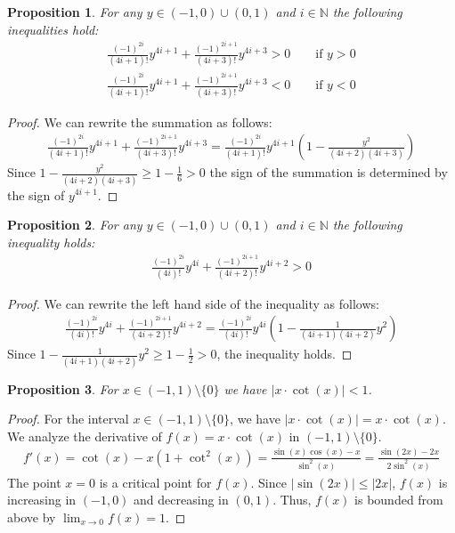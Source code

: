 \documentclass{article}
\newcommand{\nat}{\mathbb{N}}
\numberwithin{mytheorem}{section}
\newtheorem{proposition}{Proposition}
\begin{document}
\begin{proposition}\label{prop:sin_sign}
For any $y\in (-1,0) \cup (0,1)$ and $i\in \nat$ the following inequalities hold:
\begin{align*}
\frac{(-1)^{2i}}{(4i+1)!}y^{4i+1}+\frac{(-1)^{2i+1}}{(4i+3)!}y^{4i+3}>0 \qquad \text{if }y>0 \\
\frac{(-1)^{2i}}{(4i+1)!}y^{4i+1}+\frac{(-1)^{2i+1}}{(4i+3)!}y^{4i+3}<0 \qquad \text{if }y<0
\end{align*}
\end{proposition}

\begin{proof}
We can rewrite the summation as follows:
\begin{align*}
\frac{(-1)^{2i}}{(4i+1)!}y^{4i+1}+\frac{(-1)^{2i+1}}{(4i+3)!}y^{4i+3}=\frac{(-1)^{2i}}{(4i+1)!}y^{4i+1}(1-\frac{y^2}{(4i+2)(4i+3)})
\end{align*}
Since $1-\frac{y^2}{(4i+2)(4i+3)}\geq 1-\frac{1}{6}>0$ the sign of the summation is determined by the sign of $y^{4i+1}$.

\end{proof}


\begin{proposition}\label{prop:cos_sign}
For any $y\in (-1,0)\cup (0,1)$ and $i\in \nat$ the following inequality holds:
\begin{align*}
\frac{(-1)^{2i}}{(4i)!}y^{4i}+\frac{(-1)^{2i+1}}{(4i+2)!}y^{4i+2}>0
\end{align*}
\end{proposition}

\begin{proof}
We can rewrite the left hand side of the inequality as follows:
\begin{align*}
\frac{(-1)^{2i}}{(4i)!}y^{4i}+\frac{(-1)^{2i+1}}{(4i+2)!}y^{4i+2}=\frac{(-1)^{2i}}{(4i)!}y^{4i}(1-\frac{1}{(4i+1)(4i+2)}y^2)
\end{align*}
Since $1-\frac{1}{(4i+1)(4i+2)}y^2\geq 1-\frac{1}{2}>0$, the inequality holds. 

\end{proof}


\begin{proposition}\label{prop:sin_condition}
For $x\in(-1,1)\setminus\{0\}$ we have $|x\cdot\cot(x)|<1$.
\end{proposition}

\begin{proof}
For the interval $x\in(-1,1)\setminus\{0\}$, we have $|x\cdot\cot(x)|=x\cdot\cot(x)$. We analyze the derivative of $f(x)=x\cdot\cot(x)$ in $(-1,1)\setminus\{0\}$.
\begin{align*}
f'(x)=\cot(x)-x(1+\cot^2(x))=\frac{\sin(x)\cos(x)-x}{\sin^2(x)}=\frac{\sin(2x)-2x}{2\sin^2(x)}
\end{align*}
The point $x=0$ is a critical point for $f(x)$. Since $|\sin(2x)|\leq |2x|$, $f(x)$ is increasing in $(-1,0)$ and decreasing in $(0,1)$. Thus, $f(x)$ is bounded from above by $\lim_{x\to 0}f(x)=1$. 

\end{proof}
\end{document}
